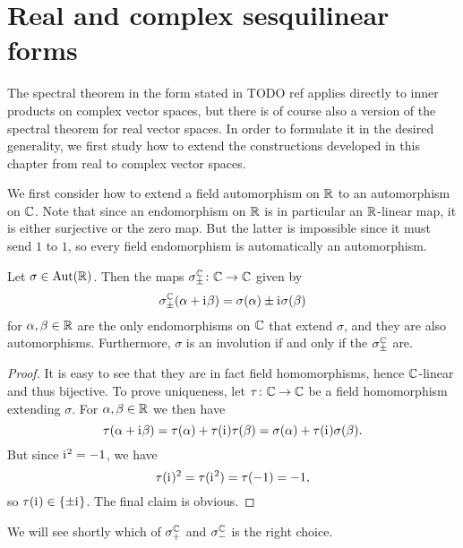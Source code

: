 \section{Real and complex sesquilinear forms}

The spectral theorem in the form stated in TODO ref applies directly to inner products on complex vector spaces, but there is of course also a version of the spectral theorem for real vector spaces. In order to formulate it in the desired generality, we first study how to extend the constructions developed in this chapter from real to complex vector spaces.


We first consider how to extend a field automorphism on $\mathbb{R}$ to an automorphism on $\mathbb{C}$. Note that since an endomorphism on $\mathbb{R}$ is in particular an $\mathbb{R}$-linear map, it is either surjective or the zero map. But the latter is impossible since it must send $1$ to $1$, so every field endomorphism is automatically an automorphism.

\begin{lemma}
    Let $\sigma \in \mathrm{Aut}(\mathbb{R})$. Then the maps $\sigma^{\mathbb{C}}_{\pm} \colon \mathbb{C} \to \mathbb{C}$ given by
    \begin{equation*}
        \sigma^{\mathbb{C}}_{\pm}(\alpha + \mathrm{i}\mkern1mu \beta)
            = \sigma(\alpha) \pm \mathrm{i}\mkern1mu \sigma(\beta)
    \end{equation*}
    for $\alpha,\beta \in \mathbb{R}$ are the only endomorphisms on $\mathbb{C}$ that extend $\sigma$, and they are also automorphisms. Furthermore, $\sigma$ is an involution if and only if the $\sigma^{\mathbb{C}}_\pm$ are.
\end{lemma}

\begin{proof}
    It is easy to see that they are in fact field homomorphisms, hence $\mathbb{C}$-linear and thus bijective. To prove uniqueness, let $\tau \colon \mathbb{C} \to \mathbb{C}$ be a field homomorphism extending $\sigma$. For $\alpha,\beta \in \mathbb{R}$ we then have
    \begin{equation*}
        \tau(\alpha + \mathrm{i}\mkern1mu \beta)
            = \tau(\alpha) + \tau(\mathrm{i}\mkern1mu) \tau(\beta)
            = \sigma(\alpha) + \tau(\mathrm{i}\mkern1mu) \sigma(\beta).
    \end{equation*}
    But since $\mathrm{i}\mkern1mu^2 = -1$, we have
    \begin{equation*}
        \tau(\mathrm{i}\mkern1mu)^2
            = \tau(\mathrm{i}\mkern1mu^2)
            = \tau(-1)
            = -1,
    \end{equation*}
    so $\tau(\mathrm{i}\mkern1mu) \in \{\pm \mathrm{i}\mkern1mu\}$. The final claim is obvious.
\end{proof}
%
We will see shortly which of $\sigma^{\mathbb{C}}_+$ and $\sigma^{\mathbb{C}}_-$ is the right choice.

